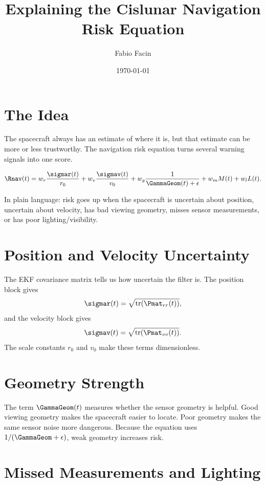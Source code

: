 \documentclass[11pt]{article}
\title{Explaining the Cislunar Navigation Risk Equation}
\author{Fabio Facin}
\date{\today}
\begin{document}
\maketitle

\section{The Idea}

The spacecraft always has an estimate of where it is, but that estimate can be
more or less trustworthy. The navigation risk equation turns several warning
signals into one score.

\begin{equation}
\Rnav(t)
=
w_r \frac{\sigmar(t)}{r_0}
+
w_v \frac{\sigmav(t)}{v_0}
+
w_g \frac{1}{\GammaGeom(t)+\epsilon}
+
w_m M(t)
+
w_l L(t).
\end{equation}

In plain language: risk goes up when the spacecraft is uncertain about
position, uncertain about velocity, has bad viewing geometry, misses sensor
measurements, or has poor lighting/visibility.

\section{Position and Velocity Uncertainty}

The EKF covariance matrix tells us how uncertain the filter is. The position
block gives
\begin{equation}
  \sigmar(t)=\sqrt{\mathrm{tr}(\Pmat_{rr}(t))},
\end{equation}
and the velocity block gives
\begin{equation}
  \sigmav(t)=\sqrt{\mathrm{tr}(\Pmat_{vv}(t))}.
\end{equation}
The scale constants $r_0$ and $v_0$ make these terms dimensionless.

\section{Geometry Strength}

The term $\GammaGeom(t)$ measures whether the sensor geometry is helpful. Good
viewing geometry makes the spacecraft easier to locate. Poor geometry makes
the same sensor noise more dangerous. Because the equation uses
$1/(\GammaGeom+\epsilon)$, weak geometry increases risk.

\section{Missed Measurements and Lighting}
\end{document}
